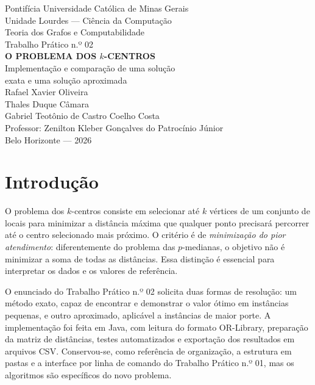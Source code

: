 \documentclass[12pt,a4paper]{article}
\begin{document}
\begin{titlepage}
\begin{center}
{\large Pontifícia Universidade Católica de Minas Gerais}\\[0.7cm]
{\large Unidade Lourdes --- Ciência da Computação}\\[3.6cm]
{\large Teoria dos Grafos e Computabilidade}\\[0.4cm]
{\large Trabalho Prático n.º 02}\\[1cm]
{\bfseries\LARGE O PROBLEMA DOS $k$-CENTROS}\\[0.6cm]
{\large Implementação e comparação de uma solução\\
exata e uma solução aproximada}\\[2.8cm]
{\large Rafael Xavier Oliveira}\\[0.28cm]
{\large Thales Duque Câmara}\\[0.28cm]
{\large Gabriel Teotônio de Castro Coelho Costa}\\[0.75cm]
{\large Professor: Zenilton Kleber Gonçalves do Patrocínio Júnior}\\[2.0cm]
{\large Belo Horizonte --- 2026}
\end{center}
\end{titlepage}

\section{Introdução}
O problema dos $k$-centros consiste em selecionar até $k$ vértices de um
conjunto de locais para minimizar a distância máxima que qualquer ponto
precisará percorrer até o centro selecionado mais próximo. O critério é de
\emph{minimização do pior atendimento}: diferentemente do problema das
$p$-medianas, o objetivo não é minimizar a soma de todas as distâncias.
Essa distinção é essencial para interpretar os dados e os valores de referência.

O enunciado do Trabalho Prático n.º 02 solicita duas formas de resolução:
um método exato, capaz de encontrar e demonstrar o valor ótimo em
instâncias pequenas, e outro aproximado, aplicável a instâncias de maior porte.
A implementação foi feita em Java, com leitura do formato OR-Library,
preparação da matriz de distâncias, testes automatizados e exportação dos
resultados em arquivos CSV. Conservou-se, como referência de organização,
a estrutura em pastas e a interface por linha de comando do Trabalho Prático
n.º 01, mas os algoritmos são específicos do novo problema.
\end{document}
